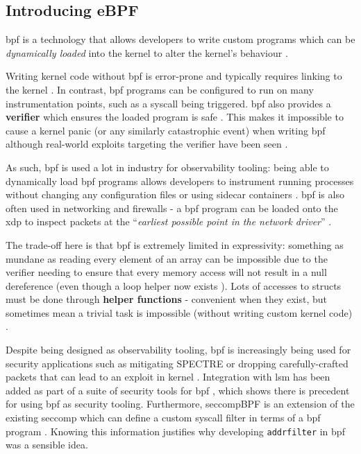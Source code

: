 \subsection{Introducing eBPF}

\ac{bpf} is a technology that allows developers to write custom programs which
can be \textit{dynamically loaded} into the kernel to alter the kernel's
behaviour \cite{LEARNING_EBPF}. 

Writing kernel code without \ac{bpf} is error-prone and typically
requires linking to the kernel \cite{UNDERSTANDING_LINUX_KERNEL}. In contrast,
\ac{bpf} programs can be configured to run on many instrumentation points, such
as a syscall being triggered. \ac{bpf} also provides a \textbf{verifier} which ensures the  loaded program is safe \cite{LEARNING_EBPF}.
This makes it impossible to cause a kernel panic (or any similarly
catastrophic event) when writing \ac{bpf} although real-world exploits targeting the
verifier have been seen \cite{BPF_VERIFIER_EXPLOIT}. 

As such, \ac{bpf} is used a lot in industry for observability tooling: being able to
dynamically load \ac{bpf} programs allows developers to instrument running processes
without changing any configuration files or using sidecar containers \cite{SIDECAR}.
\ac{bpf} is also often used in networking and firewalls \cite{LINUX_NETWORKING_OBSERVABILITY} - a \ac{bpf} program can
be loaded onto the \ac{xdp} to inspect packets at the ``\textit{earliest possible
point in the network driver}'' \cite{CILIUM_BPF_XDP_INTRO}. 

The trade-off here is that \ac{bpf} is extremely limited in expressivity:
something as mundane as reading every element of an array can be impossible due
to the verifier needing to ensure that every memory access will not result in 
a null dereference (even though a loop helper now exists \cite{BPF_LOOP_COMMIT}). Lots of accesses to structs must be done through
\textbf{helper functions} - convenient when they exist, but sometimes mean a
trivial task is impossible (without writing custom kernel code) \cite{bpf_kfuncs_docs}.

Despite being designed as observability tooling, \ac{bpf} is increasingly being
used for security applications such as mitigating SPECTRE
\cite{SPECTRE_BPF_MITIGATION} or dropping carefully-crafted packets that can
lead to an exploit in kernel \cite{BPF_PACKET_MITIGATION}. Integration with
\ac{lsm} has been added as part of a suite of security tools for \ac{bpf}
\cite{StarovoitovBPFSecurity}, which
shows there is precedent for using \ac{bpf} as security tooling. Furthermore,
seccompBPF is an extension of the existing seccomp which can define a custom
syscall filter in terms of a \ac{bpf} program \cite{seccompBPF}. Knowing this information
justifies why developing \texttt{addrfilter} in \ac{bpf} was a sensible idea.

